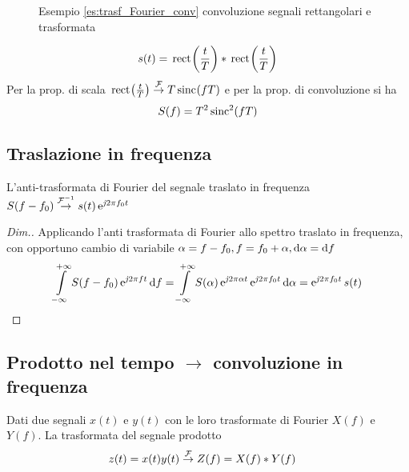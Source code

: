 \begin{esempio}\label{es:trasf_Fourier_conv}
	
\begin{figure}[h!]
\centering
{}\qquad
{}
\caption{Esempio \ref{es:trasf_Fourier_conv} convoluzione segnali rettangolari e trasformata}
\end{figure}

\[s(t)=\,{\operatorname{rect}}^{}\!\left({\frac{t}{T}}\right)\ast\,{\operatorname{rect}}^{}\!\left({\frac{t}{T}}\right)\]
Per la prop. di scala $\,{\operatorname{rect}}^{}\!\left({\frac{t}{T}}\right)\overset{\operatorname{\mathcal{F}}}{\to}T\,{\operatorname{sinc}}^{}\!\left({f T}\right)$ e per la prop. di convoluzione si ha
\[S(f)=T^2\operatorname{sinc}^2(f T)\]
\end{esempio}

\subsection{Traslazione in frequenza}
L'anti-trasformata di Fourier del segnale traslato in frequenza $S(f-f_0)\overset{\operatorname{\mathcal{F}}^{-1}}{\rightarrow}s(t)\operatorname{e}^{\operatorname{\mathit{j}\!} 2\pi f_0 t}$

\begin{proof}[Dim.]
Applicando l'anti trasformata di Fourier allo spettro traslato in frequenza, con opportuno cambio di variabile $\alpha=f-f_0, f=f_0+\alpha, \mathop{}\!\mathrm{d}\alpha=\mathop{}\!\mathrm{d} f$
\[\int\limits_{-\infty}^{+\infty}{S(f-f_0)\operatorname{e}^{\operatorname{\mathit{j}\!} 2\pi f t}}{\,\mathop{}\!\mathrm{d}{f}}=
\int\limits_{-\infty}^{+\infty}{S(\alpha)\operatorname{e}^{\operatorname{\mathit{j}\!} 2\pi\alpha t}\operatorname{e}^{\operatorname{\mathit{j}\!} 2\pi f_0 t}}{\,\mathop{}\!\mathrm{d}{\alpha}}=\operatorname{e}^{\operatorname{\mathit{j}\!} 2\pi f_0 t} s(t) \]
\end{proof}

\subsection{Prodotto nel tempo $\to$ convoluzione in frequenza}
Dati due segnali $x(t)$ e $y(t)$ con le loro trasformate di Fourier $X(f)$ e $Y(f)$. La trasformata del segnale prodotto
\begin{equation}
\begin{split}
z(t) = x(t) y(t) &\overset{\operatorname{\mathcal{F}}}{\rightarrow} Z(f) = X(f)\ast Y(f)
\end{split}
\end{equation}

